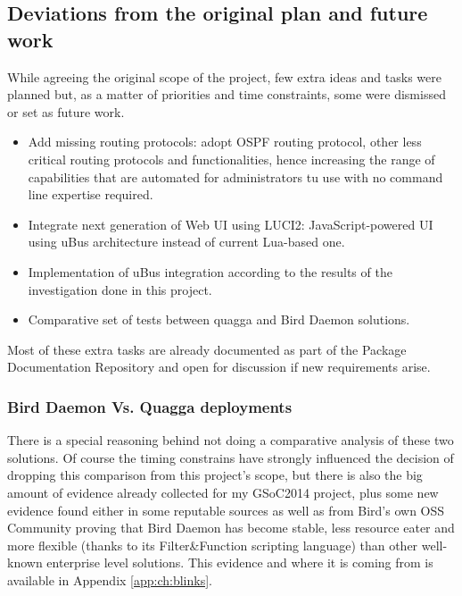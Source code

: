 \subsection{Deviations from the original plan and future work}
While agreeing the original scope of the project, few extra ideas and tasks were planned but, as a matter of priorities and time constraints, some were dismissed or set as future work.

\begin{itemize}
    \item Add missing routing protocols: adopt OSPF routing protocol, other less critical routing protocols and functionalities, hence increasing the range of capabilities that are automated for administrators tu use  with no command line expertise required.
    \item Integrate next generation of Web UI using LUCI2: JavaScript-powered UI using uBus architecture instead of current Lua-based one.
    \item Implementation of uBus integration according to the results of the investigation done in this project.
    \item Comparative set of tests between \Gls{quagga} and Bird Daemon solutions.
\end{itemize}

Most of these extra tasks are already documented as part of the Package Documentation Repository \cite{docng} and open for discussion if new requirements arise.

\subsubsection{Bird Daemon Vs. Quagga deployments}
There is a special reasoning behind not doing a comparative analysis of these two solutions. Of course the timing constrains have strongly influenced the decision of dropping this comparison from this project's scope, but there is also the big amount of evidence already collected for my GSoC2014 project, plus some new evidence found either in some reputable sources as well as from Bird's own OSS Community proving that Bird Daemon has become stable, less resource eater and more flexible (thanks to its Filter\&Function scripting language) than other well-known enterprise level solutions. This evidence and where it is coming from is available in Appendix \ref{app:ch:blinks}.


